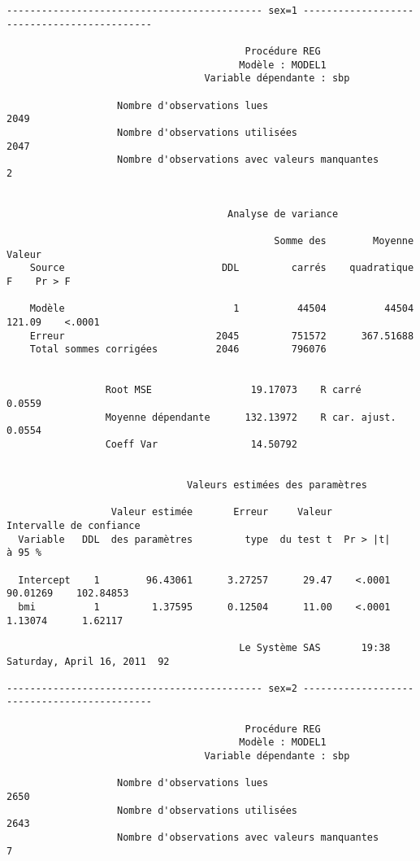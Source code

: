 \begin{verbatim}
-------------------------------------------- sex=1 --------------------------------------------

                                         Procédure REG
                                        Modèle : MODEL1
                                  Variable dépendante : sbp

                   Nombre d'observations lues                           2049
                   Nombre d'observations utilisées                      2047
                   Nombre d'observations avec valeurs manquantes           2


                                      Analyse de variance

                                              Somme des        Moyenne     Valeur
    Source                           DDL         carrés    quadratique          F    Pr > F

    Modèle                             1          44504          44504     121.09    <.0001
    Erreur                          2045         751572      367.51688
    Total sommes corrigées          2046         796076


                 Root MSE                 19.17073    R carré           0.0559
                 Moyenne dépendante      132.13972    R car. ajust.     0.0554
                 Coeff Var                14.50792


                               Valeurs estimées des paramètres

                  Valeur estimée       Erreur     Valeur             Intervalle de confiance
  Variable   DDL  des paramètres         type  du test t  Pr > |t|           à 95 %

  Intercept    1        96.43061      3.27257      29.47    <.0001     90.01269    102.84853
  bmi          1         1.37595      0.12504      11.00    <.0001      1.13074      1.62117

                                        Le Système SAS       19:38 Saturday, April 16, 2011  92

-------------------------------------------- sex=2 --------------------------------------------

                                         Procédure REG
                                        Modèle : MODEL1
                                  Variable dépendante : sbp

                   Nombre d'observations lues                           2650
                   Nombre d'observations utilisées                      2643
                   Nombre d'observations avec valeurs manquantes           7



\end{verbatim}
